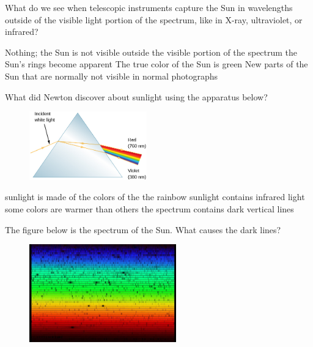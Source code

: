 \documentclass[addpoints]{exam}
\begin{document}
\begin{questions}



\question
What do we see when telescopic instruments capture the Sun in wavelengths outside of the visible light portion of the spectrum, like in X-ray, ultraviolet, or infrared?

\begin{choices}
    \choice Nothing; the Sun is not visible outside the visible portion of the spectrum
    \choice the Sun's rings become apparent
    \choice The true color of the Sun is green
    \correctchoice New parts of the Sun that are normally not visible in normal photographs
\end{choices}

\question
What did Newton discover about sunlight using the apparatus below?

\begin{figure}[h!]
    \centering
    \includegraphics[width=2in]{Figures/Figure5.9.jpg}
\end{figure}

\begin{choices}
    \correctchoice sunlight is made of the colors of the the rainbow
    \choice sunlight contains infrared light
    \choice some colors are warmer than others
    \choice the spectrum contains dark vertical lines
\end{choices}

\question
The figure below is the spectrum of the Sun. What causes the dark lines?

\begin{figure}[h!]
    \centering
    \includegraphics[width=2.5in]{Figures/Figure5.11.jpg}
\end{figure}


\end{questions}
\end{document}

